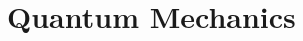 \documentclass{article}
\begin{document}
\section{Quantum Mechanics}\label{sec:quantum}

\cite{knuth84}

\end{document}
